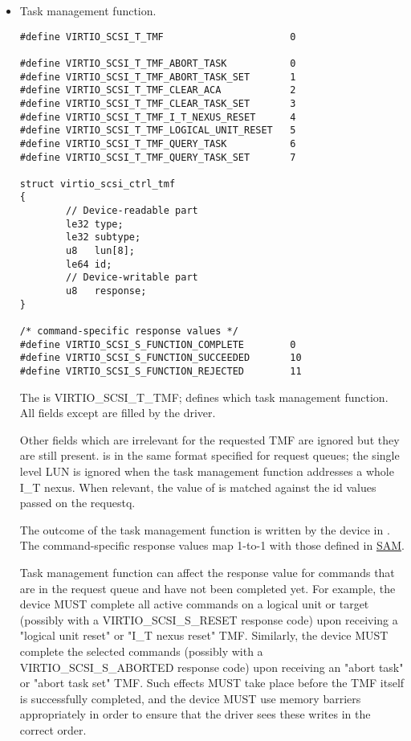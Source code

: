 \begin{itemize}
\item Task management function.
\begin{lstlisting}
#define VIRTIO_SCSI_T_TMF                      0

#define VIRTIO_SCSI_T_TMF_ABORT_TASK           0
#define VIRTIO_SCSI_T_TMF_ABORT_TASK_SET       1
#define VIRTIO_SCSI_T_TMF_CLEAR_ACA            2
#define VIRTIO_SCSI_T_TMF_CLEAR_TASK_SET       3
#define VIRTIO_SCSI_T_TMF_I_T_NEXUS_RESET      4
#define VIRTIO_SCSI_T_TMF_LOGICAL_UNIT_RESET   5
#define VIRTIO_SCSI_T_TMF_QUERY_TASK           6
#define VIRTIO_SCSI_T_TMF_QUERY_TASK_SET       7

struct virtio_scsi_ctrl_tmf
{
        // Device-readable part
        le32 type;
        le32 subtype;
        u8   lun[8];
        le64 id;
        // Device-writable part
        u8   response;
}

/* command-specific response values */
#define VIRTIO_SCSI_S_FUNCTION_COMPLETE        0
#define VIRTIO_SCSI_S_FUNCTION_SUCCEEDED       10
#define VIRTIO_SCSI_S_FUNCTION_REJECTED        11
\end{lstlisting}

  The  is VIRTIO_SCSI_T_TMF;  defines which
  task management function. All
  fields except  are filled by the driver.

  Other fields which are irrelevant for the requested TMF
  are ignored but they are still present. 
  is in the same format specified for request queues; the
  single level LUN is ignored when the task management function
  addresses a whole I_T nexus. When relevant, the value of 
  is matched against the id values passed on the requestq.

  The outcome of the task management function is written by the
  device in . The command-specific response
  values map 1-to-1 with those defined in \hyperref[intro:SAM]{SAM}.

  Task management function can affect the response value for commands that
  are in the request queue and have not been completed yet.  For example,
  the device MUST complete all active commands on a logical unit
  or target (possibly with a VIRTIO_SCSI_S_RESET response code)
  upon receiving a "logical unit reset" or "I_T nexus reset" TMF.
  Similarly, the device MUST complete the selected commands (possibly
  with a VIRTIO_SCSI_S_ABORTED response code) upon receiving an "abort
  task" or "abort task set" TMF.  Such effects MUST take place before
  the TMF itself is successfully completed, and the device MUST use
  memory barriers appropriately in order to ensure that the driver sees
  these writes in the correct order.


\end{itemize}
